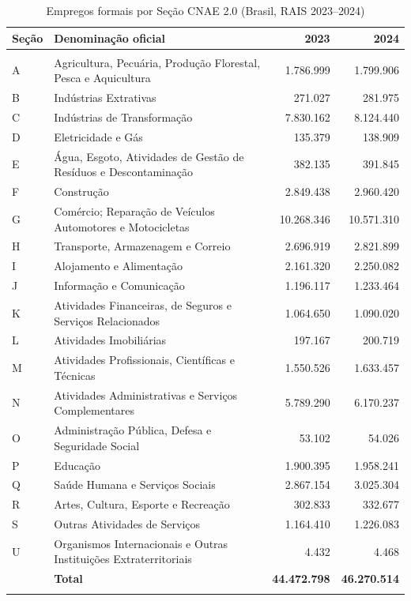 \begin{table}[!htbp]
	\centering
	\caption{Empregos formais por Seção CNAE 2.0 (Brasil, RAIS 2023–2024)}
	\label{tab:rais_cnae}
	\footnotesize
	\setlength{\tabcolsep}{4pt}
	\begin{tabular}{@{\extracolsep{5pt}} p{1cm} p{7.7cm} r r}
		\textbf{Seção} & \textbf{Denominação oficial} & \textbf{2023} & \textbf{2024} \\
		\hline\\[-1.2ex]
		A & Agricultura, Pecuária, Produção Florestal, Pesca e Aquicultura & 1.786.999 & 1.799.906 \\
		B & Indústrias Extrativas & 271.027 & 281.975 \\
		C & Indústrias de Transformação & 7.830.162 & 8.124.440 \\
		D & Eletricidade e Gás & 135.379 & 138.909 \\
		E & Água, Esgoto, Atividades de Gestão de Resíduos e Descontaminação & 382.135 & 391.845 \\
		F & Construção & 2.849.438 & 2.960.420 \\
		G & Comércio; Reparação de Veículos Automotores e Motocicletas & 10.268.346 & 10.571.310 \\
		H & Transporte, Armazenagem e Correio & 2.696.919 & 2.821.899 \\
		I & Alojamento e Alimentação & 2.161.320 & 2.250.082 \\
		J & Informação e Comunicação & 1.196.117 & 1.233.464 \\
		K & Atividades Financeiras, de Seguros e Serviços Relacionados & 1.064.650 & 1.090.020 \\
		L & Atividades Imobiliárias & 197.167 & 200.719 \\
		M & Atividades Profissionais, Científicas e Técnicas & 1.550.526 & 1.633.457 \\
		N & Atividades Administrativas e Serviços Complementares & 5.789.290 & 6.170.237 \\
		O & Administração Pública, Defesa e Seguridade Social & 53.102 & 54.026 \\
		P & Educação & 1.900.395 & 1.958.241 \\
		Q & Saúde Humana e Serviços Sociais & 2.867.154 & 3.025.304 \\
		R & Artes, Cultura, Esporte e Recreação & 302.833 & 332.677 \\
		S & Outras Atividades de Serviços & 1.164.410 & 1.226.083 \\
		U & Organismos Internacionais e Outras Instituições Extraterritoriais & 4.432 & 4.468 \\
		\hline
		 & \textbf{Total} & \textbf{44.472.798} & \textbf{46.270.514} \\
		\hline\\[-1.6ex]
	\end{tabular}


\end{table}
